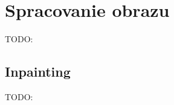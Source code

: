 \section{Spracovanie obrazu \label{cap:image_processing}}

TODO:

\subsection{Inpainting}

TODO:






